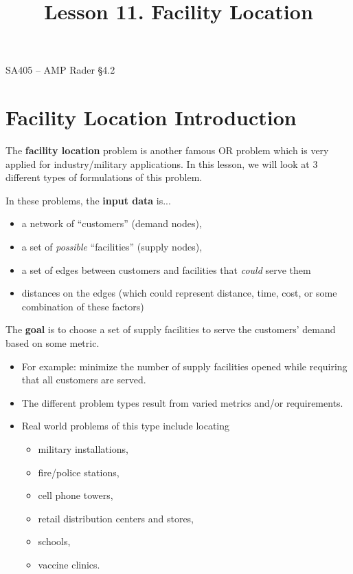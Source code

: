 \documentclass[11pt]{article}
\makeatletter
\theoremstyle{definition}
\renewcommand{\maketitle}{
  \noindent SA405 -- AMP \hfill Rader \S 4.2 \\

  \begin{center}\Large{\textbf{\@title}}\end{center}
}
\makeatother
\begin{document}
  
\title{Lesson 11.  Facility Location}

\maketitle

\section{Facility Location Introduction}

The \textbf{facility location} problem is another famous OR problem which is very applied for industry/military applications. In this lesson, we will look at 3 different types of formulations of this problem.


In these problems, the \textbf{input data} is...
\begin{itemize}
\item  a network of ``customers'' (demand nodes),
\item  a set of \emph{possible} ``facilities'' (supply nodes),
\item  a set of edges between customers and facilities that \emph{could} serve them
\item  distances on the edges (which could represent distance, time, cost, or some combination of these factors)
\end{itemize} 


The \textbf{goal} is to choose a set of supply facilities to serve the customers' demand based on some metric.
\begin{itemize}
\item For example: minimize the number of supply facilities opened while requiring that all customers are served.  
\item The different problem types result from varied metrics and/or requirements.
\item  Real world problems of this type include locating 
\begin{itemize}
\item military installations, 
\item fire/police stations, 
\item cell phone towers, 
\item retail distribution centers and stores, 
\item schools,
\item vaccine clinics.
\end{itemize}
\end{itemize}
\end{document}
